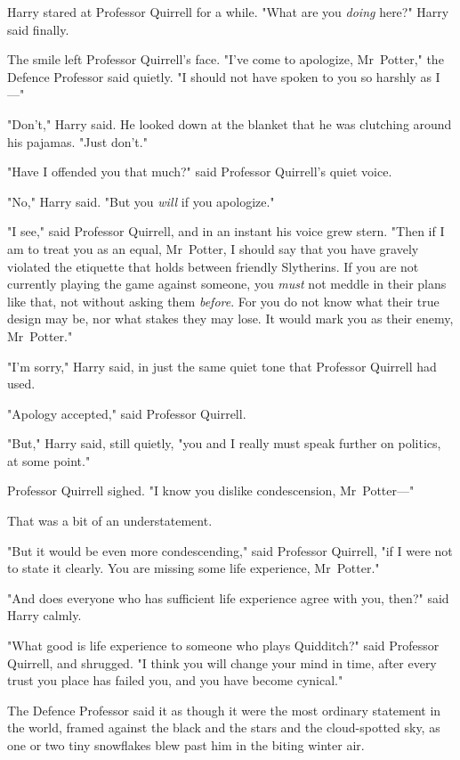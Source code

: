 Harry stared at Professor Quirrell for a while. "What are you \emph{doing}
here?" Harry said finally.

The smile left Professor Quirrell’s face. "I’ve come to apologize, Mr~Potter,"
the Defence Professor said quietly. "I should not have spoken to you so harshly
as I—"

"Don’t," Harry said. He looked down at the blanket that he was clutching around
his pajamas. "Just don’t."

"Have I offended you that much?" said Professor Quirrell’s quiet voice.

"No," Harry said. "But you \emph{will} if you apologize."

"I see," said Professor Quirrell, and in an instant his voice grew stern. "Then
if I am to treat you as an equal, Mr~Potter, I should say that you have
gravely violated the etiquette that holds between friendly Slytherins. If you
are not currently playing the game against someone, you \emph{must} not meddle
in their plans like that, not without asking them \emph{before}. For you do not
know what their true design may be, nor what stakes they may lose. It would
mark you as their enemy, Mr~Potter."

"I’m sorry," Harry said, in just the same quiet tone that Professor Quirrell
had used.

"Apology accepted," said Professor Quirrell.

"But," Harry said, still quietly, "you and I really must speak further on
politics, at some point."

Professor Quirrell sighed. "I know you dislike condescension, Mr~Potter—"

That was a bit of an understatement.

"But it would be even more condescending," said Professor Quirrell, "if I were
not to state it clearly. You are missing some life experience, Mr~Potter."

"And does everyone who has sufficient life experience agree with you, then?"
said Harry calmly.

"What good is life experience to someone who plays Quidditch?" said Professor
Quirrell, and shrugged. "I think you will change your mind in time, after every
trust you place has failed you, and you have become cynical."

The Defence Professor said it as though it were the most ordinary statement in
the world, framed against the black and the stars and the cloud-spotted sky, as
one or two tiny snowflakes blew past him in the biting winter air.

